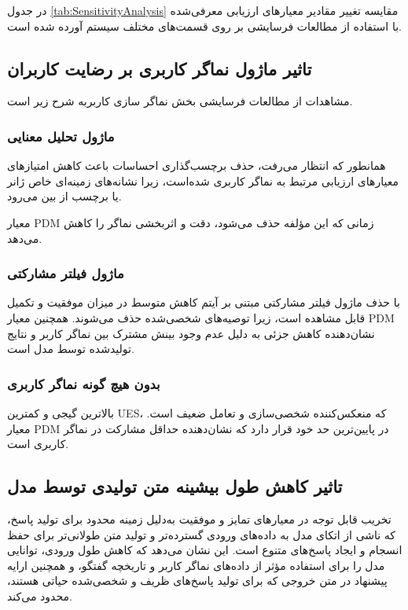 در جدول 
\ref{tab:SensitivityAnalysis}
مقایسه تغییر مقادیر معیارهای ارزیابی معرفی‌شده با استفاده از مطالعات فرسایشی بر روی قسمت‌های مختلف سیستم آورده شده است.






\subsection{تاثیر ماژول نماگر کاربری بر رضایت کاربران}
مشاهدات از مطالعات فرسایشی بخش نماگر سازی کاربربه شرح زیر است.

\subsubsection{ماژول تحلیل معنایی}

همانطور که انتظار می‌رفت، حذف برچسب‌گذاری احساسات باعث کاهش امتیازهای معیارهای ارزیابی مرتبط به نماگر کاربری شده‌است، زیرا نشانه‌های زمینه‌ای خاص ژانر یا برچسب از بین می‌رود.

معیار PDM زمانی که این مؤلفه حذف می‌شود، دقت و اثربخشی نماگر را کاهش می‌دهد. 

\subsubsection{ماژول فیلتر مشارکتی}

با حذف ماژول فیلتر مشارکتی مبتنی بر آیتم کاهش متوسط ​​در میزان موفقیت و تکمیل قابل مشاهده است، زیرا توصیه‌های شخصی‌شده حذف می‌شوند.
همچنین معیار PDM نشان‌دهنده کاهش جزئی به دلیل عدم وجود بینش مشترک بین نماگر کاربر و نتایج تولیدشده توسط مدل است.

\subsubsection{بدون هیچ‌ گونه نماگر کاربری}

بالاترین گیجی و کمترین UES، که منعکس‌کننده شخصی‌سازی و تعامل ضعیف است. معیار PDM در پایین‌ترین حد خود قرار دارد که نشان‌دهنده حداقل مشارکت در نماگر کاربری است.

\subsection{تاثیر کاهش طول بیشینه متن تولیدی توسط مدل}

تخریب قابل توجه در معیارهای تمایز و موفقیت به‌دلیل زمینه محدود برای تولید پاسخ، که ناشی از اتکای مدل به داده‌های ورودی گسترده‌تر و تولید متن طولانی‌تر برای حفظ انسجام و ایجاد پاسخ‌های متنوع است. این نشان می‌دهد که کاهش طول ورودی، توانایی مدل را برای استفاده مؤثر از داده‌های نماگر کاربر و تاریخچه گفتگو، و همچنین ارایه پیشنهاد در متن خروجی که برای تولید پاسخ‌های ظریف و شخصی‌شده حیاتی هستند، محدود می‌کند.


